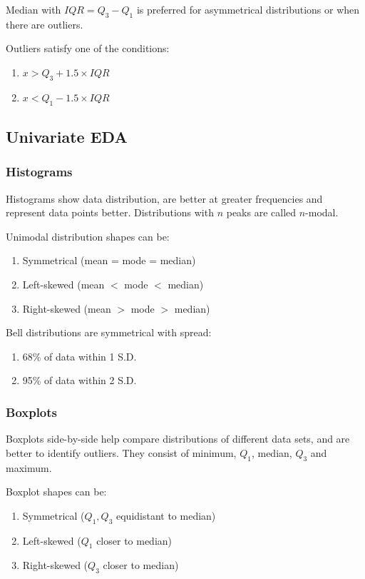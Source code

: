 \documentclass[12pt, a4paper]{article}
\begin{document}
\begin{multicols*}{3}
Median with $IQR = Q_3 - Q_1$ is preferred for asymmetrical distributions or when there are outliers.

Outliers satisfy one of the conditions:
\begin{enumerate}[\roman*.]
  \item $x > Q_3 + 1.5 \times IQR$
  \item $x < Q_1 - 1.5 \times IQR$
\end{enumerate}

\subsection{Univariate EDA}
\subsubsection{Histograms}
Histograms show data distribution, are better at greater frequencies and represent data points better.
Distributions with $n$ peaks are called $n$-modal.

Unimodal distribution shapes can be:
\begin{enumerate}[\roman*.]
  \item Symmetrical \hfill(mean = mode = median)
  \item Left-skewed \hfill(mean $<$ mode $<$ median)
  \item Right-skewed \hfill(mean $>$ mode $>$ median)
\end{enumerate}

Bell distributions are symmetrical with spread:
\begin{enumerate}[\roman*.]
  \item 68\% of data within 1 S.D.
  \item 95\% of data within 2 S.D.
\end{enumerate}
\colbreak
\subsubsection{Boxplots}
Boxplots side-by-side help compare distributions of different data sets, and are better to identify outliers.
They consist of minimum, $Q_1$, median, $Q_3$ and maximum.

Boxplot shapes can be:
\begin{enumerate}[\roman*.]
  \item Symmetrical \hfill($Q_1, Q_3$ equidistant to median)
  \item Left-skewed \hfill($Q_1$ closer to median)
  \item Right-skewed \hfill($Q_3$ closer to median)
\end{enumerate}


\end{multicols*}
\end{document}
